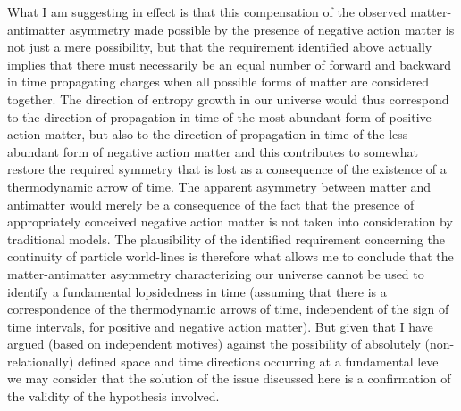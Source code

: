 \documentclass[notitlepage,12pt]{report}
\begin{document}
What I am suggesting in effect is that this compensation of the observed matter-antimatter asymmetry made possible by the presence of negative action matter is not just a mere possibility, but that the requirement identified above actually implies that there must necessarily be an equal number of forward and backward in time propagating charges when all possible forms of matter are considered together. The direction of entropy growth in our universe would thus correspond to the direction of propagation in time of the most abundant form of positive action matter, but also to the direction of propagation in time of the less abundant form of negative action matter and this contributes to somewhat restore the required symmetry that is lost as a consequence of the existence of a thermodynamic arrow of time. The apparent asymmetry between matter and antimatter would merely be a consequence of the fact that the presence of appropriately conceived negative action matter is not taken into consideration by traditional models. The plausibility of the identified requirement concerning the continuity of particle world-lines is therefore what allows me to conclude that the matter-antimatter asymmetry characterizing our universe cannot be used to identify a fundamental lopsidedness in time (assuming that there is a correspondence of the thermodynamic arrows of time, independent of the sign of time intervals, for positive and negative action matter). But given that I have argued (based on independent motives) against the possibility of absolutely (non-relationally) defined space and time directions occurring at a fundamental level we may consider that the solution of the issue discussed here is a confirmation of the validity of the hypothesis involved.
\end{document}
